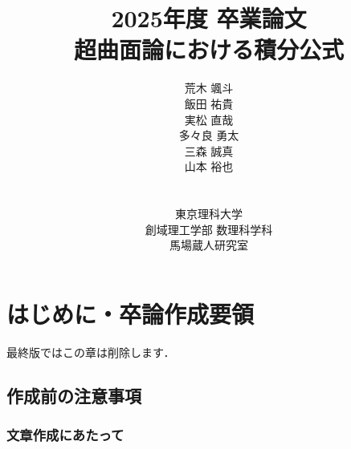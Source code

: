 \documentclass[12pt,a4j,final]{jreport}
\title{2025年度 卒業論文\\
\vspace{4\baselineskip}
超曲面論における積分公式
\vspace{4\baselineskip}
}
\author{
荒木 颯斗\\
飯田 祐貴\\
実松 直哉\\
多々良 勇太\\
三森 誠真\\
山本 裕也\\\\\\
東京理科大学\\
創域理工学部 数理科学科\\
馬場蔵人研究室
}
\date{} %
\theoremstyle{definition}
\begin{document}
\maketitle

\tableofcontents

\chapter{はじめに・卒論作成要領}

最終版ではこの章は削除します．

\section{作成前の注意事項}

\subsection{文章作成にあたって}
\end{document}
